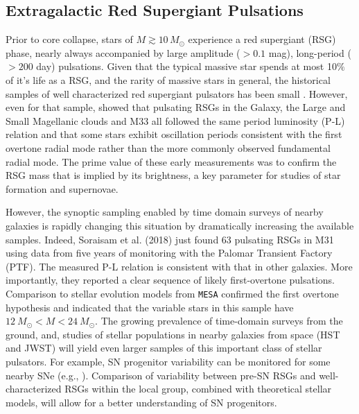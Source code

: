 {\color{green}
\subsection{Extragalactic Red Supergiant Pulsations}
}


Prior to core collapse, stars of $M \! \gtrsim \! 10 \, M_\odot$ experience a red
supergiant (RSG) phase, nearly always accompanied by large amplitude
($>0.1$ mag), long-period ($>200 $ day) pulsations.  Given that the
typical massive star spends at most 10$\%$ of it's life as a RSG, and
the rarity of massive stars in general, the historical samples of well
characterized red supergiant pulsators has been small \citep[see][for a nice compilation]{Yang_2012}. However, even for that sample, \citet{Yang_2012} showed that pulsating RSGs in the Galaxy, the Large and Small Magellanic clouds and M33 all followed the
same period luminosity (P-L) relation and that some stars exhibit
oscillation periods consistent with the first overtone radial mode
rather than the more commonly observed fundamental radial mode. The
prime value of these early measurements was to confirm the RSG mass
that is implied by its brightness, a key parameter for studies of star
formation and supernovae. 

However, the synoptic sampling enabled by time domain surveys of
nearby galaxies is rapidly changing this situation by dramatically
increasing the available samples. Indeed, Soraisam et al. (2018) just
found 63 pulsating RSGs in M31 using data from five years of
monitoring with the Palomar Transient Factory (PTF). The measured P-L
relation is consistent with that in other galaxies. More importantly,
they reported a clear sequence of likely first-overtone
pulsations. Comparison to stellar evolution models from \texttt{MESA}
confirmed the first overtone hypothesis and indicated that the
variable stars in this sample have $12~M_{\odot} \! < \! M \! < \! 24~M_{\odot}$. The growing prevalence of time-domain surveys from the ground, and, studies 
of stellar populations in nearby galaxies from space (HST and JWST) 
will yield even larger samples of this important class of stellar pulsators. For example, SN progenitor variability can be monitored for some nearby SNe (e.g., \citealt{kochanek:17}). Comparison of variability between pre-SN RSGs and well-characterized RSGs within the local group, combined with theoretical stellar models, will allow for a better understanding of SN progenitors.